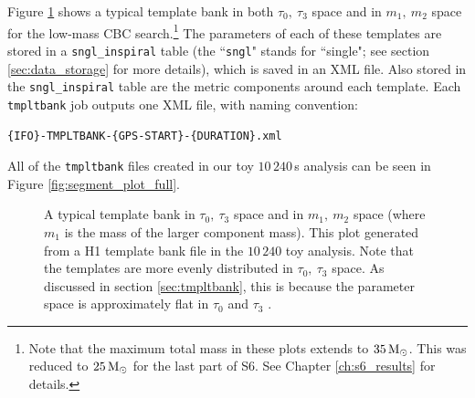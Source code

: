 Figure \ref{fig:template_bank} shows a typical template bank in both
$\tau_0,~\tau_3$ space and in $m_1,~m_2$ space for the low-mass \ac{CBC}
search.\footnote{Note that the maximum total mass in these plots extends to
$35\,\mathrm{M_\odot}$. This was reduced to $25\,\mathrm{M_\odot}$ for the last part of \ac{S6}. See
Chapter \ref{ch:s6_results} for details.} The parameters of each of these
templates are stored in a \texttt{sngl\_inspiral} table (the ``\texttt{sngl}"
stands for ``single"; see section \ref{sec:data_storage} for more details),
which is saved in an XML file. Also stored in the \texttt{sngl\_inspiral} table
are the metric components around each template. Each \texttt{tmpltbank} job
outputs one XML file, with naming convention: \begin{center}
\texttt{\{IFO\}-TMPLTBANK-\{GPS-START\}-\{DURATION\}.xml} \end{center} All of
the \texttt{tmpltbank} files created in our toy $10\,240\,$s analysis can be
seen in Figure \ref{fig:segment_plot_full}.

\begin{figure}[htbp]
\center
{}
\caption{
A typical template bank in $\tau_0,~\tau_3$ space and in $m_1,~m_2$ space
(where $m_1$ is the mass of the larger component mass). This plot generated
from a H1 template bank file in the $10\,240$ toy analysis. Note that the
templates are more evenly distributed in $\tau_0,~\tau_3$ space. As discussed
in section \ref{sec:tmpltbank}, this is because the parameter space is
approximately flat in $\tau_0$ and $\tau_3$ \cite{Owen:1995tm, Owen:1998dk,
Tanaka:2000, BBCCS:2006, hexabank}.  } \label{fig:template_bank} \end{figure}
